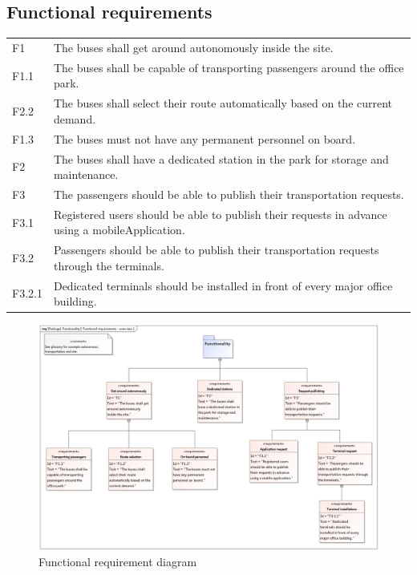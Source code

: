 \documentclass[a4paper]{article}
\begin{document}
\subsection{Functional requirements}
\begin{tabularx}{\textwidth}{p{.75cm} X}
	F1     & The buses shall get around \gls{autonomous}ly inside the
	         \gls{site}. \\

	F1.1   & The buses shall be capable of transporting passengers around
	         the office park. \\

	F2.2   & The buses shall select their \gls{route} \gls{automatically}
	         based on the current demand. \\

        F1.3   & The buses must not have any permanent personnel on board. \\

	F2     & The buses shall have a dedicated \gls{station} in the park for
	         storage and maintenance. \\

	F3     & The passengers should be able to publish their
	         \gls{transportation} \gls{request}s. \\

	F3.1   & Registered users should be able to publish their \gls{request}s
	         in advance using a \gls{mobileApplication}. \\

	F3.2   & Passengers should be able to publish their \gls{transportation}
	         \gls{request}s through the \gls{terminal}s. \\

	F3.2.1 & Dedicated \gls{terminal}s should be installed in front of every
	         major office building. \\
\end{tabularx}

\begin{figure}
	\centering
	\includegraphics[width=\textwidth]{req-functional.jpg}
	\caption{Functional requirement diagram}%
	\label{fig:req-functional}
\end{figure}
\end{document}
